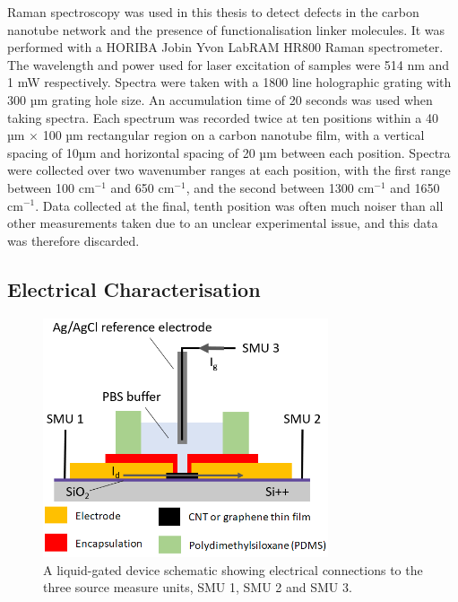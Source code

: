 \documentclass[
  a4paper,
]{scrbook}
\begin{document}
Raman spectroscopy was used in this thesis to detect defects in the
carbon nanotube network and the presence of functionalisation linker
molecules. It was performed with a HORIBA Jobin Yvon LabRAM HR800 Raman
spectrometer. The wavelength and power used for laser excitation of
samples were 514 nm and 1 mW respectively. Spectra were taken with a
1800 line holographic grating with 300 µm grating hole size. An
accumulation time of 20 seconds was used when taking spectra. Each
spectrum was recorded twice at ten positions within a 40 µm \(\times\)
100 µm rectangular region on a carbon nanotube film, with a vertical
spacing of 10µm and horizontal spacing of 20 µm between each position.
Spectra were collected over two wavenumber ranges at each position, with
the first range between 100 cm\(^{-1}\) and 650 cm\(^{-1}\), and the
second between 1300 cm\(^{-1}\) and 1650 cm\(^{-1}\). Data collected at
the final, tenth position was often much noiser than all other
measurements taken due to an unclear experimental issue, and this data
was therefore discarded.

\hypertarget{sec-electrical-characterisation}{%
\subsection{Electrical
Characterisation}\label{sec-electrical-characterisation}}

\begin{figure}

{\centering \includegraphics[width=0.75\textwidth,height=\textheight]{figures/ch4/liquid-gate-schematic.png}

}

\caption{\label{fig-liquid-gate}A liquid-gated device schematic showing
electrical connections to the three source measure units, SMU 1, SMU 2
and SMU 3.}

\end{figure}
\end{document}
